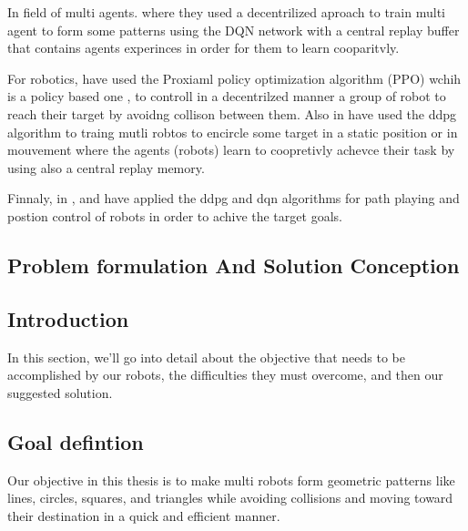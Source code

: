 \documentclass[12pt]{extarticle}
\begin{document}
In field of multi agents. \cite{diallo2020multi} where they used a decentrilized aproach to train multi agent to form some patterns using the DQN network with  a central replay buffer that contains agents experinces in order for them to learn cooparitvly.


For robotics, \cite{long2018towards} have used the Proxiaml policy optimization algorithm (PPO) wchih is a policy based one , to controll in a decentrilzed manner a group of robot to reach their target by avoidng collison between them. Also in \cite{ma2020multi} have used the ddpg algorithm to traing mutli robtos to encircle some target in a static position  or in mouvement where the agents (robots) learn to coopretivly achevce their task by using also a central replay memory.
 

Finnaly, in \cite{dong2020mobile},\cite{gong2022efficient} and \cite{quiroga2022position} have applied the ddpg and dqn algorithms for path playing and postion control of robots in order to achive the target goals.






 

  
  
  
\newpage
\pagebreak
\hspace{0pt}
\vfill
\begin{center}
\section{Problem formulation And Solution Conception}
\end{center}
\vfill
\hspace{0pt}

\pagebreak

 

\subsection{Introduction}
 In this section, we'll go into  detail about the objective that needs to be accomplished by our robots, the difficulties they must overcome, and then our suggested solution.
 
\subsection{Goal defintion}
Our objective in this thesis is to make multi robots  form geometric patterns like lines, circles, squares, and triangles while avoiding collisions and moving toward their destination in a quick and efficient manner. 
\end{document}

